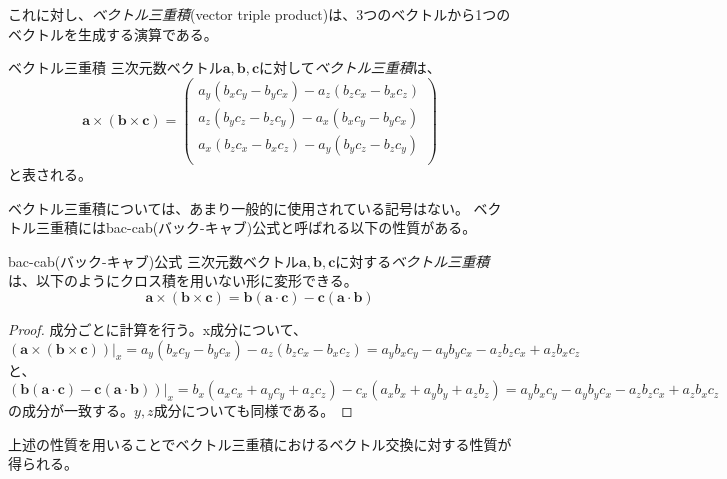 これに対し、\emph{ベクトル三重積}(vector triple product)は、3つのベクトルから1つのベクトルを生成する演算である。
\begin{definition*}{ベクトル三重積}
	三次元数ベクトル\(\boldsymbol{a},\boldsymbol{b},\boldsymbol{c}\)に対して\emph{ベクトル三重積}は、
	\begin{equation}
		\boldsymbol{a}\times(\boldsymbol{b}\times\boldsymbol{c})=
		\begin{pmatrix}
			a_y (b_x c_y - b_y c_x) - a_z (b_z c_x - b_x c_z) \\
			a_z (b_y c_z - b_z c_y) - a_x (b_xc_y - b_y c_x)  \\
			a_x (b_z c_x - b_x c_z) - a_y (b_y c_z - b_z c_y) \\
		\end{pmatrix}
	\end{equation}
	と表される。
\end{definition*}
ベクトル三重積については、あまり一般的に使用されている記号はない。
ベクトル三重積にはbac-cab(バック-キャブ)公式と呼ばれる以下の性質がある。
\begin{theorem*}{bac-cab(バック-キャブ)公式}
	三次元数ベクトル\(\boldsymbol{a},\boldsymbol{b},\boldsymbol{c}\)に対する\emph{ベクトル三重積}は、以下のようにクロス積を用いない形に変形できる。
	\begin{equation}
		\boldsymbol{a}\times(\boldsymbol{b}\times\boldsymbol{c})
		=\boldsymbol{b}(\boldsymbol{a}\cdot\boldsymbol{c})
		-\boldsymbol{c} (\boldsymbol{a}\cdot\boldsymbol{b})
	\end{equation}
\end{theorem*}
\begin{proof}
	成分ごとに計算を行う。x成分について、
	\begin{equation}
		(\boldsymbol{a}\times(\boldsymbol{b}\times\boldsymbol{c}))|_x=
		a_y (b_x c_y - b_y c_x) - a_z (b_z c_x - b_x c_z)=a_y b_x c_y - a_y b_y c_x - a_z b_z c_x +a_z  b_x c_z
	\end{equation}
	と、
	\begin{equation}
		(\boldsymbol{b}(\boldsymbol{a}\cdot\boldsymbol{c})
		-\boldsymbol{c} (\boldsymbol{a}\cdot\boldsymbol{b}))|_x=
		b_x (a_x c_x+a_y c_y +a_z c_z) - c_x (a_x b_x+a_y b_y +a_z b_z)=a_y b_x c_y - a_y b_y c_x - a_z b_z c_x +a_z  b_x c_z
	\end{equation}
	の成分が一致する。\(y,z\)成分についても同様である。
\end{proof}
上述の性質を用いることでベクトル三重積におけるベクトル交換に対する性質が得られる。
